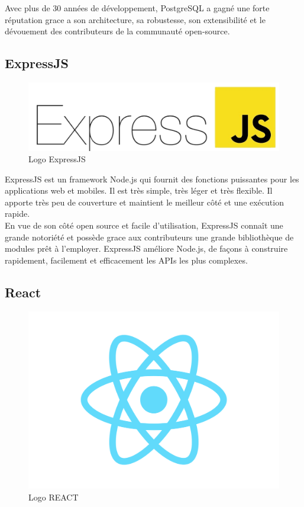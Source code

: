     Avec plus de 30 années de développement, PostgreSQL a gagné une forte réputation grace a son architecture, sa robustesse, son extensibilité et le dévouement des contributeurs de la communauté open-source.\\

    \subsection{ExpressJS}
    \begin{figure}[H]
        \centering
        \includegraphics[scale=0.16]{ACR/ExpressJS-logo.png}
        \caption{Logo ExpressJS}
    \end{figure}
    
    ExpressJS\cite{expressjs} est un framework Node.js qui fournit des fonctions puissantes pour les applications web et mobiles. Il est très simple, très léger et très flexible. Il apporte très peu de couverture et maintient le meilleur côté et une exécution rapide.\\

    En vue de son côté open source et facile d'utilisation, ExpressJS connaît une grande notoriété et possède grace aux contributeurs une grande bibliothèque de modules prêt à l'employer. ExpressJS améliore Node.js, de façons à construire rapidement, facilement et efficacement les APIs les plus complexes.\\ 

    \subsection{React}
    \begin{figure}[H]
        \centering
        \includegraphics[scale=0.16]{ACR/react.png}
        \caption{Logo REACT}
    \end{figure}

